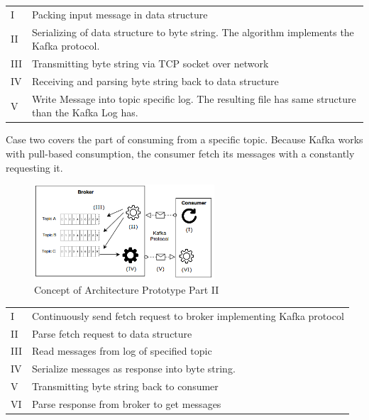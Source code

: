 \begin{table}[h]
\begin{tabular}{ll}
I   & Packing input message in data structure                                                          \\
II  & Serializing of data structure to byte string. The algorithm implements the Kafka protocol.       \\
III & Transmitting byte string via TCP socket over network                                             \\
IV  & Receiving and parsing byte string back to data structure                                         \\
V   & Write Message into topic specific log. The resulting file has same structure than the Kafka Log has.
\end{tabular}
\end{table}

Case two covers the part of consuming from a specific topic. Because Kafka works with 
pull-based consumption, the consumer fetch its messages with a constantly requesting it. 

\begin{figure}[H]
    \centering
   \includegraphics[width=0.6\textwidth]{images/concept_consumer.png}
    \caption{Concept of Architecture Prototype Part II}
    \label{fig:concept-consumer}
\end{figure}

\begin{table}[h]
\begin{tabular}{ll}
I   & Continuously send fetch request to broker implementing Kafka protocol \\
II  & Parse fetch request to data structure                                 \\
III & Read messages from log of specified topic                             \\
IV  & Serialize messages as response into byte string.                      \\
V   & Transmitting byte string back to consumer                             \\
VI  & Parse response from broker to get messages                           
\end{tabular}
\end{table}


